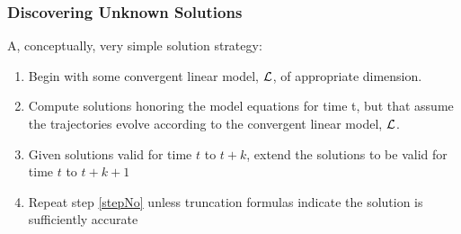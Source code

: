 \documentclass[letter]{beamer}
\begin{document}
\begin{frame}
  \frametitle{Discovering Unknown Solutions}

A, conceptually, very simple solution strategy:  

  \begin{enumerate}
  \item Begin with some convergent linear model, ${\mathcal{L}}$, of appropriate dimension.
  \item Compute solutions honoring the model equations for time t, 
but that assume the trajectories evolve according to the convergent 
linear model, ${\mathcal{L}}$.
  \item Given solutions valid for time $t$ to $t+k$, extend the solutions to be valid for time $t$ to $t+k+1$ \label{stepNo}
\item Repeat step \ref{stepNo} unless truncation formulas indicate the solution is sufficiently accurate
  \end{enumerate}


\end{frame}
\end{document}
